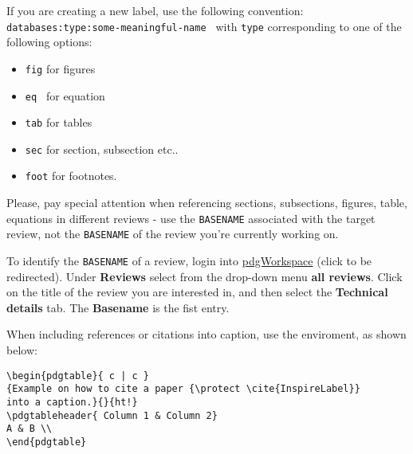 If you are creating a new label, use the following convention: {\tt databases:type:some-meaningful-name }
with {\tt type} corresponding to one of the following options:
\begin{itemize}
\item {\tt fig} for figures
\item {\tt eq } for equation
\item {\tt tab} for tables
\item {\tt sec} for section, subsection etc..
\item {\tt foot} for footnotes.
\end{itemize}

Please, pay special attention when referencing sections, subsections, figures, table, equations in different reviews - use the {\tt BASENAME} associated
with the target review, not the {\tt BASENAME} of the review you're currently working on. 


To identify the {\tt BASENAME} of a review, login into \href{https://pdgprod.lbl.gov/pdgprod/PdgWorkspace/Reviews.action}{pdgWorkspace} (click to be redirected). Under \textbf{Reviews} select from the drop-down menu \textbf{all reviews}. Click on the title of the review you are interested in, and then select the \textbf{Technical details} tab. The \textbf{Basename} is the fist entry.

When including references or citations into caption, use the {\tt \string\protect} enviroment, as shown below:
\begin{verbatim}
\begin{pdgtable}{ c | c }
{Example on how to cite a paper {\protect \cite{InspireLabel}}
into a caption.}{}{ht!} 
\pdgtableheader{ Column 1 & Column 2}
A & B \\
\end{pdgtable}
\end{verbatim}



